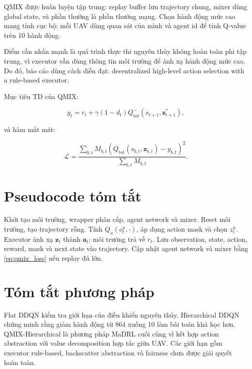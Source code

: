 QMIX được huấn luyện tập trung: replay buffer lưu trajectory chung, mixer dùng global state, và phần thưởng là phần thưởng mạng. Chọn hành động mức cao mang tính cục bộ: mỗi UAV dùng quan sát của mình và agent id để tính Q-value trên 10 hành động.

Điểm cần nhấn mạnh là quá trình thực thi nguyên thủy không hoàn toàn phi tập trung, vì executor vẫn dùng thông tin môi trường để ánh xạ hành động mức cao. Do đó, báo cáo dùng cách diễn đạt: decentralized high-level action selection with a rule-based executor.

Mục tiêu TD của QMIX:

\begin{equation}
y_t=r_t+\gamma(1-d_t)Q_{\mathrm{tot}}^{-}(s_{t+1},\mathbf{z}^{*}_{t+1}),
\label{eq:qmix_target}
\end{equation}

và hàm mất mát:

\begin{equation}
\mathcal{L}=
\frac{\sum_{b,t}M_{b,t}\left(Q_{\mathrm{tot}}(s_{b,t},\mathbf{z}_{b,t})-y_{b,t}\right)^2}
{\sum_{b,t}M_{b,t}}.
\label{eq:qmix_loss}
\end{equation}

\section{Pseudocode tóm tắt}

\begin{algorithm}[H]
\caption{Huấn luyện QMIX-Hierarchical}
\label{alg:qmix_short}
\begin{algorithmic}[1]
\State Khởi tạo môi trường, wrapper phân cấp, agent network và mixer.
  \State Reset môi trường, tạo trajectory rỗng.
      \State Tính \(Q_u(o^u_t,\cdot)\), áp dụng action mask và chọn \(z^u_t\).
    \EndFor
    \State Executor ánh xạ \(\mathbf{z}_t\) thành \(\mathbf{a}_t\); môi trường trả về \(r_t\).
    \State Lưu observation, state, action, reward, mask và next state vào trajectory.
  \EndFor
  \State Cập nhật agent network và mixer bằng \eqref{eq:qmix_loss} nếu replay đủ lớn.
\EndFor
\end{algorithmic}
\end{algorithm}

\section{Tóm tắt phương pháp}

Flat DDQN kiểm tra giới hạn của điều khiển nguyên thủy. Hierarchical DDQN chứng minh rằng giảm hành động từ 864 xuống 10 làm bài toán khả học hơn. QMIX-Hierarchical là phương pháp MaDRL cuối cùng vì kết hợp action abstraction với value decomposition hợp tác giữa UAV. Các giới hạn gồm executor rule-based, backscatter abstraction và fairness chưa được giải quyết hoàn toàn.
